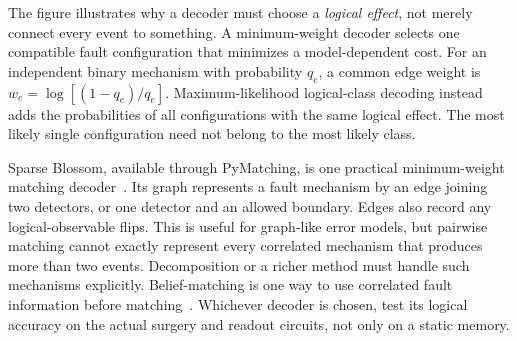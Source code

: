 \documentclass[11pt,a4paper]{article}
\begin{document}
\begin{center}
\label{fig:paths}
\end{center}

The figure illustrates why a decoder must choose a \emph{logical effect}, not merely connect every event to something. A minimum-weight decoder selects one compatible fault configuration that minimizes a model-dependent cost. For an independent binary mechanism with probability $q_e$, a common edge weight is $w_e=\log[(1-q_e)/q_e]$. Maximum-likelihood logical-class decoding instead adds the probabilities of all configurations with the same logical effect. The most likely single configuration need not belong to the most likely class.

Sparse Blossom, available through PyMatching, is one practical minimum-weight matching decoder~\cite{matching}. Its graph represents a fault mechanism by an edge joining two detectors, or one detector and an allowed boundary. Edges also record any logical-observable flips. This is useful for graph-like error models, but pairwise matching cannot exactly represent every correlated mechanism that produces more than two events. Decomposition or a richer method must handle such mechanisms explicitly. Belief-matching is one way to use correlated fault information before matching~\cite{belief}. Whichever decoder is chosen, test its logical accuracy on the actual surgery and readout circuits, not only on a static memory.
\end{document}
